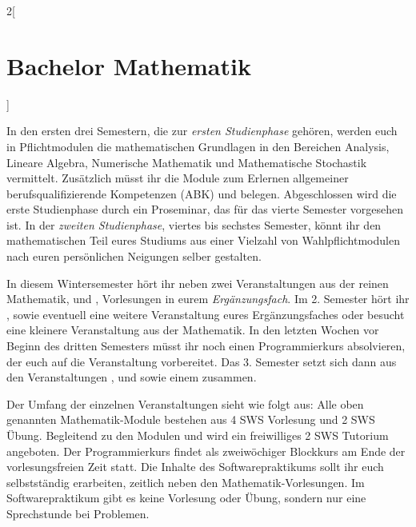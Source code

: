 \begin{multicols}{2}[\section{Bachelor Mathematik}]

In den ersten drei Semestern, die zur \emph{ersten Studienphase} gehören,
werden euch in Pflichtmodulen die mathematischen Grundlagen in den Bereichen
Analysis, Lineare Algebra, Numerische Mathematik und Mathematische Stochastik
vermittelt. Zusätzlich müsst ihr die Module zum Erlernen allgemeiner
berufsqualifizierende Kompetenzen (ABK)  und
 belegen. Abgeschlossen wird die erste Studienphase
durch ein Proseminar, das für das vierte Semester vorgesehen ist.  In der
\emph{zweiten Studienphase}, viertes bis sechstes Semester, könnt ihr den
mathematischen Teil eures Studiums aus einer Vielzahl von Wahlpflichtmodulen
nach euren persönlichen Neigungen selber gestalten. 

In diesem Wintersemester hört ihr neben zwei Veranstaltungen aus der reinen
Mathematik,  und , Vorlesungen in eurem \emph{Ergänzungsfach}. Im 2. Semester hört
ihr , 
sowie eventuell eine weitere Veranstaltung eures Ergänzungsfaches oder besucht
eine kleinere Veranstaltung aus der Mathematik. In den letzten Wochen vor
Beginn des dritten Semesters müsst ihr noch einen Programmierkurs absolvieren,
der euch auf die Veranstaltung  vorbereitet. Das
3.  Semester setzt sich dann aus den Veranstaltungen ,
 und  sowie einem
 zusammen. 

Der Umfang der einzelnen Veranstaltungen sieht wie folgt aus: Alle oben
genannten Mathematik-Module bestehen aus 4 SWS Vorlesung und 2 SWS Übung.
Begleitend zu den Modulen  und  wird ein freiwilliges 2 SWS Tutorium angeboten. Der
Programmierkurs findet als zweiwöchiger Blockkurs am Ende der vorlesungsfreien
Zeit statt. Die Inhalte des Softwarepraktikums sollt ihr euch selbstständig
erarbeiten, zeitlich neben den Mathematik-Vorlesungen. Im Softwarepraktikum
gibt es keine Vorlesung oder Übung, sondern nur eine Sprechstunde bei
Problemen.


\end{multicols}
